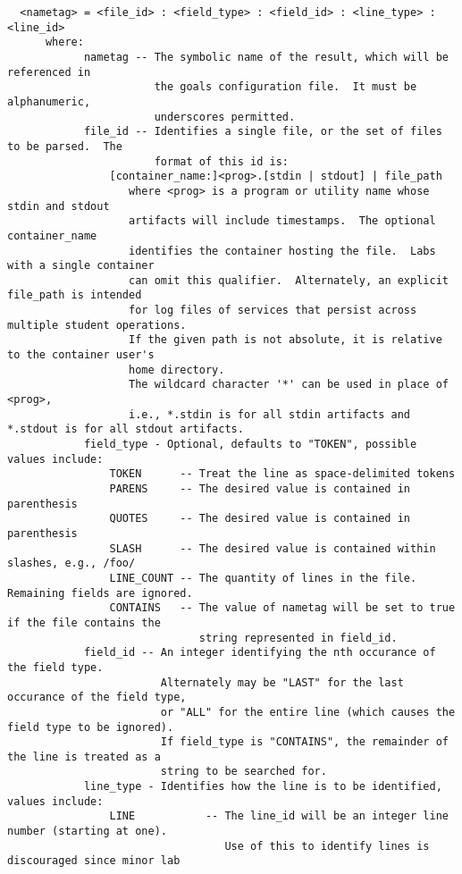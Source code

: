 \documentclass{article}
\begin{document}
\begin{verbatim}
  <nametag> = <file_id> : <field_type> : <field_id> : <line_type> : <line_id>
      where:
            nametag -- The symbolic name of the result, which will be referenced in 
                       the goals configuration file.  It must be alphanumeric, 
                       underscores permitted.
            file_id -- Identifies a single file, or the set of files to be parsed.  The 
                       format of this id is:
                [container_name:]<prog>.[stdin | stdout] | file_path
                   where <prog> is a program or utility name whose stdin and stdout 
                   artifacts will include timestamps.  The optional container_name 
                   identifies the container hosting the file.  Labs with a single container 
                   can omit this qualifier.  Alternately, an explicit file_path is intended 
                   for log files of services that persist across multiple student operations. 
                   If the given path is not absolute, it is relative to the container user's 
                   home directory. 
                   The wildcard character '*' can be used in place of <prog>,
                   i.e., *.stdin is for all stdin artifacts and *.stdout is for all stdout artifacts.
            field_type - Optional, defaults to "TOKEN", possible values include:
                TOKEN      -- Treat the line as space-delimited tokens
                PARENS     -- The desired value is contained in parenthesis
                QUOTES     -- The desired value is contained in parenthesis
                SLASH      -- The desired value is contained within slashes, e.g., /foo/
                LINE_COUNT -- The quantity of lines in the file. Remaining fields are ignored.
                CONTAINS   -- The value of nametag will be set to true if the file contains the
                              string represented in field_id.
            field_id -- An integer identifying the nth occurance of the field type.
                        Alternately may be "LAST" for the last occurance of the field type,
                        or "ALL" for the entire line (which causes the field type to be ignored).
                        If field_type is "CONTAINS", the remainder of the line is treated as a 
                        string to be searched for.
            line_type - Identifies how the line is to be identified, values include:
                LINE           -- The line_id will be an integer line number (starting at one). 
                                  Use of this to identify lines is discouraged since minor lab 

\end{verbatim}
\end{document}
